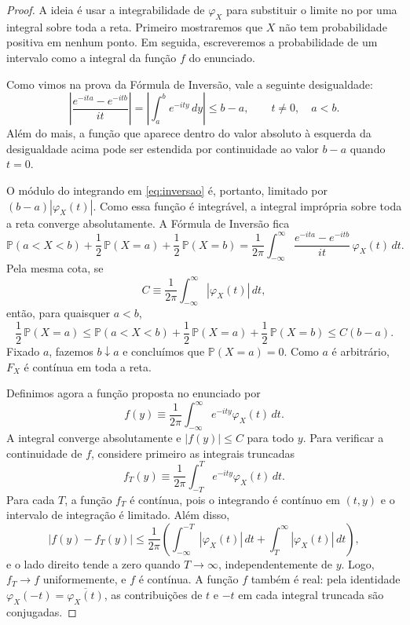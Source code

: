 \documentclass[12pt,portuguese]{article}
\theoremstyle{definition}
\theoremstyle{plainexercise}
\theoremstyle{starredexercise}
\theoremstyle{definition}
\begin{document}
\begin{proof}
A ideia é usar a integrabilidade de $\varphi_X$ para substituir o limite no
 por uma integral sobre toda a reta. Primeiro mostraremos
que $X$ não tem probabilidade positiva em nenhum ponto. Em seguida,
escreveremos a probabilidade de um intervalo como a integral da função $f$
do enunciado.

Como vimos na prova da Fórmula de Inversão, vale a seguinte desigualdade:
\begin{equation}\label{eq:cota-nucleo-inversao}
\left|\frac{e^{-ita}-e^{-itb}}{it}\right|
=\left|\int_a^b e^{-ity}\,dy\right|
\leqslant b-a,
\qquad t\neq0,\quad a<b.
\end{equation}
Além do mais, a função que aparece dentro do valor absoluto 
à esquerda da desigualdade acima pode ser estendida por
continuidade ao valor $b-a$ quando $t=0$.

O módulo do integrando em
\eqref{eq:inversao} é, portanto, limitado por
$(b-a)|\varphi_X(t)|$. Como essa função é integrável, a integral imprópria
sobre toda a reta converge absolutamente. A Fórmula de Inversão fica
\begin{equation}\label{eq:inversao-integravel}
\mathbb{P}(a<X<b)
+\frac12\,\mathbb{P}(X=a)
+\frac12\,\mathbb{P}(X=b)
=
\frac{1}{2\pi}\int_{-\infty}^{\infty}
\frac{e^{-ita}-e^{-itb}}{it}\,\varphi_X(t)\,dt.
\end{equation}
Pela mesma cota, se
\[
C\equiv\frac{1}{2\pi}\int_{-\infty}^{\infty}|\varphi_X(t)|\,dt,
\]
então, para quaisquer $a<b$,
\[
\frac12\,\mathbb{P}(X=a)
\leqslant
\mathbb{P}(a<X<b)
+\frac12\,\mathbb{P}(X=a)
+\frac12\,\mathbb{P}(X=b)
\leqslant C(b-a).
\]
Fixado $a$, fazemos $b\downarrow a$ e concluímos que
$\mathbb{P}(X=a)=0$. Como $a$ é arbitrário, $F_X$ é contínua em toda a reta.

Definimos agora a função proposta no enunciado por
\[
f(y)\equiv\frac{1}{2\pi}\int_{-\infty}^{\infty}
e^{-ity}\varphi_X(t)\,dt.
\]
A integral converge absolutamente e $|f(y)|\leqslant C$ para todo $y$.
Para verificar a continuidade de $f$, considere primeiro as integrais
truncadas
\[
f_T(y)\equiv\frac{1}{2\pi}\int_{-T}^{T}e^{-ity}\varphi_X(t)\,dt.
\]
Para cada $T$, a função $f_T$ é contínua, pois o integrando é contínuo em
$(t,y)$ e o intervalo de integração é limitado. Além disso,
\[
|f(y)-f_T(y)|
\leqslant\frac{1}{2\pi}
\left(\int_{-\infty}^{-T}|\varphi_X(t)|\,dt
+\int_T^{\infty}|\varphi_X(t)|\,dt\right),
\]
e o lado direito tende a zero quando $T\to\infty$, independentemente de $y$.
Logo, $f_T\to f$ uniformemente, e $f$ é contínua. A função $f$ também é
real: pela identidade $\varphi_X(-t)=\overline{\varphi_X(t)}$, as
contribuições de $t$ e $-t$ em cada integral truncada são conjugadas.


\end{proof}
\end{document}
